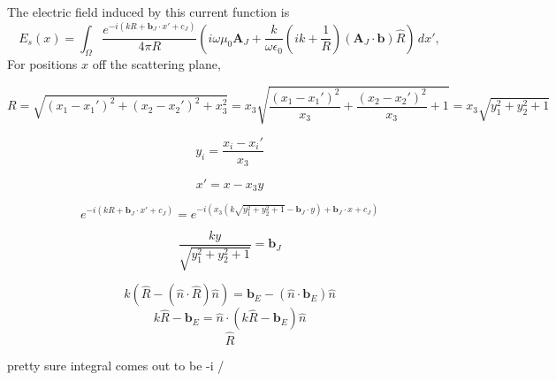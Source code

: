 \documentclass{article}
\theoremstyle{plain}
\begin{document}
The electric field induced by this current function is 
\begin{equation}
	E_s(x)
	= \int_\Omega \frac{e^{-i(kR+\mathbf{b}_J\cdot x' + c_J)}}{4\pi R}
	\left( i\omega\mu_0 \mathbf{A}_J
	+ \frac{k}{\omega\epsilon_0}\left( ik + \frac{1}{R} \right)(\mathbf{A}_J\cdot\mathbf{b}) \hat{R} \right) \,dx',
\end{equation}
For positions $x$ off the scattering plane, 











\begin{equation}
	R = \sqrt{ \left(x_1-x_1'\right)^2 + \left(x_2-x_2'\right)^2 + x_3^2 }
	= x_3\sqrt{ \frac{\left(x_1-x_1'\right)^2}{x_3} + \frac{\left(x_2-x_2'\right)^2}{x_3} + 1 }
	= x_3\sqrt{ y_1^2 + y_2^2 + 1 }
\end{equation}

\begin{equation}
	y_i = \frac{x_i-x_i'}{x_3}
\end{equation}

\begin{equation}
	x' = x - x_3y
\end{equation}

\begin{equation}
	e^{-i(kR+\mathbf{b}_J\cdot x' + c_J)}
	= e^{-i\left(x_3\left(k\sqrt{ y_1^2 + y_2^2 + 1 }-\mathbf{b}_J\cdot y\right) + \mathbf{b}_J\cdot x + c_J \right)}
\end{equation}

\begin{equation}
	\frac{ky}{\sqrt{ y_1^2 + y_2^2 + 1 }} = \mathbf{b}_J
\end{equation}

\begin{equation}
	k(\hat{R} - (\hat{n}\cdot\hat{R})\hat{n}) = \mathbf{b}_E - (\hat{n}\cdot\mathbf{b}_E)\hat{n}
\end{equation}
\begin{equation}
	k\hat{R} - \mathbf{b}_E = \hat{n}\cdot\left( k\hat{R} - \mathbf{b}_E \right)\hat{n}
\end{equation}
\begin{equation}
	\hat{R} 
\end{equation}


pretty sure integral comes out to be -i / 
\end{document}
